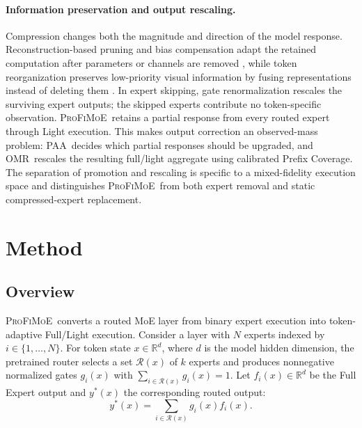 \documentclass{article}
\newcommand{\PAA}{\textsc{PAA}}
\newcommand{\OMR}{\textsc{OMR}}
\newcommand{\method}{\textsc{ProFiMoE}}
\newcommand{\Rset}{\mathcal{R}}
\begin{document}
\paragraph{Information preservation and output rescaling.}
Compression changes both the magnitude and direction of the model response. Reconstruction-based pruning and bias compensation adapt the retained computation after parameters or channels are removed \citep{frantar2023sparsegpt,an2024flap}, while token reorganization preserves low-priority visual information by fusing representations instead of deleting them \citep{liang2022evit}. In expert skipping, gate renormalization rescales the surviving expert outputs; the skipped experts contribute no token-specific observation. \method\ retains a partial response from every routed expert through Light execution. This makes output correction an observed-mass problem: \PAA\ decides which partial responses should be upgraded, and \OMR\ rescales the resulting full/light aggregate using calibrated Prefix Coverage. The separation of promotion and rescaling is specific to a mixed-fidelity execution space and distinguishes \method\ from both expert removal and static compressed-expert replacement.

\section{Method}
\label{sec:method}

\subsection{Overview}

\method\ converts a routed MoE layer from binary expert execution into token-adaptive Full/Light execution. Consider a layer with $N$ experts indexed by $i\in\{1,\ldots,N\}$. For token state $x\in\mathbb{R}^{d}$, where $d$ is the model hidden dimension, the pretrained router selects a set $\Rset(x)$ of $k$ experts and produces nonnegative normalized gates $g_i(x)$ with $\sum_{i\in\Rset(x)}g_i(x)=1$. Let $f_i(x)\in\mathbb{R}^{d}$ be the Full Expert output and $y^*(x)$ the corresponding routed output:
\begin{equation}
  y^*(x)=\sum_{i\in\Rset(x)} g_i(x)f_i(x).
  \label{eq:full-output}
\end{equation}
\end{document}
